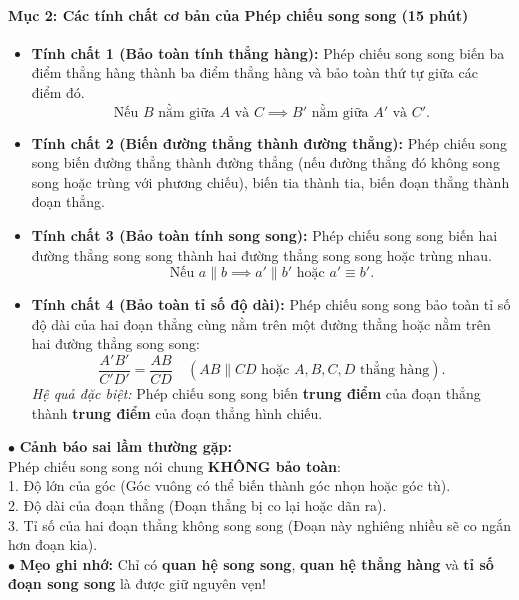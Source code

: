 \documentclass[12pt, a4paper]{article}
\begin{document}
\paragraph{Mục 2: Các tính chất cơ bản của Phép chiếu song song (15 phút)}
\begin{itemize}
    \item \textbf{Tính chất 1 (Bảo toàn tính thẳng hàng):} Phép chiếu song song biến ba điểm thẳng hàng thành ba điểm thẳng hàng và bảo toàn thứ tự giữa các điểm đó.
    $$\text{Nếu } B \text{ nằm giữa } A \text{ và } C \implies B' \text{ nằm giữa } A' \text{ và } C'.$$
    \item \textbf{Tính chất 2 (Biến đường thẳng thành đường thẳng):} Phép chiếu song song biến đường thẳng thành đường thẳng (nếu đường thẳng đó không song song hoặc trùng với phương chiếu), biến tia thành tia, biến đoạn thẳng thành đoạn thẳng.
    \item \textbf{Tính chất 3 (Bảo toàn tính song song):} Phép chiếu song song biến hai đường thẳng song song thành hai đường thẳng song song hoặc trùng nhau.
    $$\text{Nếu } a \parallel b \implies a' \parallel b' \text{ hoặc } a' \equiv b'.$$
    \item \textbf{Tính chất 4 (Bảo toàn tỉ số độ dài):} Phép chiếu song song bảo toàn tỉ số độ dài của hai đoạn thẳng cùng nằm trên một đường thẳng hoặc nằm trên hai đường thẳng song song:
    $$\dfrac{A'B'}{C'D'} = \dfrac{AB}{CD} \quad (AB \parallel CD \text{ hoặc } A, B, C, D \text{ thẳng hàng}).$$
    \textit{Hệ quả đặc biệt:} Phép chiếu song song biến \textbf{trung điểm} của đoạn thẳng thành \textbf{trung điểm} của đoạn thẳng hình chiếu.
\end{itemize}

\begin{scaffoldbox}
    $\bullet$ \textbf{Cảnh báo sai lầm thường gặp:}\\
    Phép chiếu song song nói chung \textbf{KHÔNG bảo toàn}:\\
    1. Độ lớn của góc (Góc vuông có thể biến thành góc nhọn hoặc góc tù).\\
    2. Độ dài của đoạn thẳng (Đoạn thẳng bị co lại hoặc dãn ra).\\
    3. Tỉ số của hai đoạn thẳng không song song (Đoạn này nghiêng nhiều sẽ co ngắn hơn đoạn kia).\\
    $\bullet$ \textbf{Mẹo ghi nhớ:} Chỉ có \textbf{quan hệ song song}, \textbf{quan hệ thẳng hàng} và \textbf{tỉ số đoạn song song} là được giữ nguyên vẹn!
\end{scaffoldbox}
\end{document}
